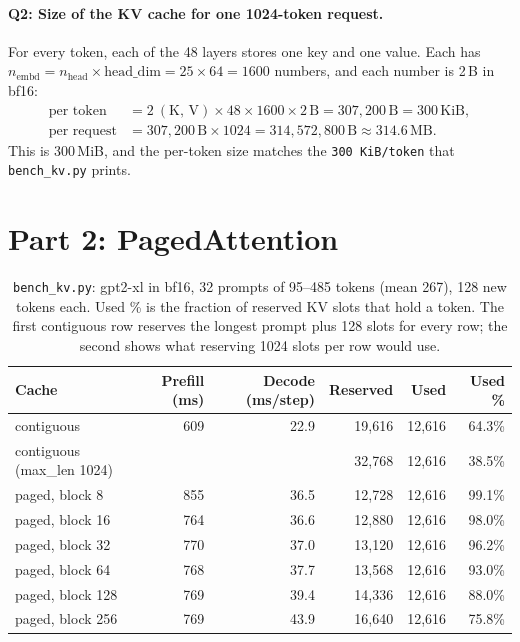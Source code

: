 \documentclass[10pt]{article}
\begin{document}
\paragraph{Q2: Size of the KV cache for one 1024-token request.}
For every token, each of the 48 layers stores one key and one value. Each
has $n_\text{embd} = n_\text{head} \times \text{head\_dim} = 25 \times 64
= 1600$ numbers, and each number is 2\,B in bf16:
\begin{align*}
\text{per token} &= 2\ (\text{K, V}) \times 48 \times 1600 \times 2\,\text{B}
  = 307{,}200\,\text{B} = 300\,\text{KiB}, \\
\text{per request} &= 307{,}200\,\text{B} \times 1024
  = 314{,}572{,}800\,\text{B} \approx 314.6\,\text{MB}.
\end{align*}
This is 300\,MiB, and the per-token size matches the
\texttt{300 KiB/token} that \texttt{bench\_kv.py} prints.

\section*{Part 2: PagedAttention}

\begin{table}[htbp]
\caption{\texttt{bench\_kv.py}: gpt2-xl in bf16, 32 prompts of 95--485
tokens (mean 267), 128 new tokens each. Used \% is the fraction of
reserved KV slots that hold a token. The first contiguous row reserves
the longest prompt plus 128 slots for every row; the second shows what
reserving 1024 slots per row would use.}
\label{tab:kv}
\centering
\begin{tabular}{lrrrrr}
\toprule
Cache & Prefill (ms) & Decode (ms/step) & Reserved & Used & Used \% \\
\midrule
contiguous                 & 609 & 22.9 & 19{,}616 & 12{,}616 & 64.3\% \\
contiguous (max\_len 1024) &     &      & 32{,}768 & 12{,}616 & 38.5\% \\
paged, block 8   & 855 & 36.5 & 12{,}728 & 12{,}616 & 99.1\% \\
paged, block 16  & 764 & 36.6 & 12{,}880 & 12{,}616 & 98.0\% \\
paged, block 32  & 770 & 37.0 & 13{,}120 & 12{,}616 & 96.2\% \\
paged, block 64  & 768 & 37.7 & 13{,}568 & 12{,}616 & 93.0\% \\
paged, block 128 & 769 & 39.4 & 14{,}336 & 12{,}616 & 88.0\% \\
paged, block 256 & 769 & 43.9 & 16{,}640 & 12{,}616 & 75.8\% \\
\bottomrule
\end{tabular}
\end{table}
\end{document}

